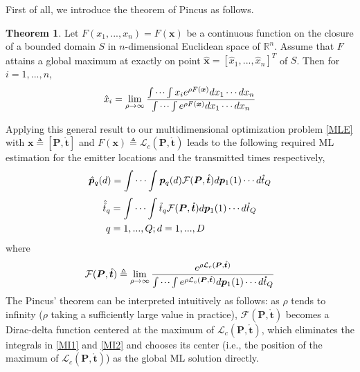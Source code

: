 \documentclass[review]{elsarticle}
\begin{document}
First of all, we introduce the theorem of Pincus \cite{Pincus1968A} as follows.
\theoremstyle{definition} \newtheorem{Theorem}{Theorem}
\begin{Theorem}
    Let $F(x_1,...,x_n)=F(\boldsymbol{x})$ be a continuous function on the closure of a bounded domain $S$ in $n$-dimensional Euclidean space of $\mathbb{R}^n$. Assume that $F$ attains a global maximum at exactly on point $\hat{\boldsymbol{x}}=[\hat{x}_1,...,\hat{x}_n]^T$ of $S$. Then for $i=1,...,n$,
    \begin{align}\label{Pincus}
    \hat{x}_i=\lim_{\rho\to \infty}\frac{\idotsint x_i e^{\rho F(\boldsymbol{x})}dx_1\cdots dx_n}{\idotsint e^{\rho F(\boldsymbol{x})}dx_1\cdots dx_n}
    \end{align}
\end{Theorem}
Applying this general result to our multidimensional optimization problem \eqref{MLE} with $\boldsymbol{x}\triangleq[\boldsymbol{P},\mathring{\boldsymbol{t}}]$ and $F(\boldsymbol{x})\triangleq \mathcal{L}_c(\boldsymbol{P},\mathring{\boldsymbol{t}})$ leads to the following required ML estimation for the emitter locations and the transmitted times respectively,
\begin{align}\label{MI1}
    \hat{\boldsymbol{p}}_q(d)=\idotsint \boldsymbol{p}_q(d) \mathcal{F}(\boldsymbol{P},\mathring{\boldsymbol{t}})d\boldsymbol{p}_1(1) \cdots d\mathring{t}_Q
\end{align}
\begin{align}\label{MI2}    
    \hat{\mathring{t}}_q&=\idotsint \mathring{t}_q \mathcal{F}(\boldsymbol{P},\mathring{\boldsymbol{t}})d\boldsymbol{p}_1(1) \cdots d\mathring{t}_Q\\ 
    q&=1,...,Q;d=1,...,D \nonumber
\end{align}
where 
\begin{align}\label{gc}
    \mathcal{F}(\boldsymbol{P},\mathring{\boldsymbol{t}})\triangleq\lim_{\rho\to \infty}\frac{e^{\rho \mathcal{L}_c(\boldsymbol{P},\mathring{\boldsymbol{t}})}}{\idotsint e^{\rho \mathcal{L}_c(\boldsymbol{P},\mathring{\boldsymbol{t}})}d\boldsymbol{p}_1(1) \cdots d\mathring{t}_Q}
\end{align}
The Pincus' theorem can be interpreted intuitively as follows: as $\rho$ tends to infinity ($\rho$ taking a sufficiently large value in practice), $\mathcal{F}(\boldsymbol{P},\mathring{\boldsymbol{t}})$ becomes a Dirac-delta function centered at the maximum of $\mathcal{L}_c(\boldsymbol{P},\mathring{\boldsymbol{t}})$, which eliminates the integrals in \eqref{MI1} and \eqref{MI2} and chooses its center (i.e., the position of the maximum of $\mathcal{L}_c(\boldsymbol{P},\mathring{\boldsymbol{t}})$) as the global ML solution directly. 
\end{document}
